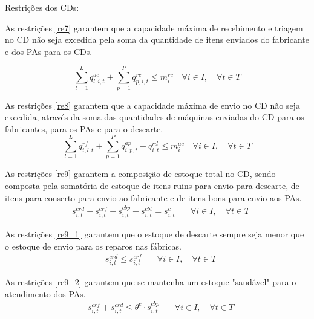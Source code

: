 
Restrições dos CDs:

As restrições \ref{re7} garantem que a capacidade máxima de recebimento e triagem no CD não seja excedida pela soma da quantidade de itens enviados do fabricante e dos PAs para os CDs.

\begin{equation}\label{re7}
\sum_{l=1}^{L} q^{ac}_{l,i,t} + \sum_{p=1}^{P} q^{rc}_{p,i,t} \leq m^{rc}_{i} \quad \forall i \in I, \quad \forall t \in T
\end{equation}

As restrições \ref{re8} garantem que a capacidade máxima de envio no CD não seja excedida, através da soma das quantidades de máquinas enviadas do CD para os fabricantes, para os PAs e para o descarte.
\begin{equation}\label{re8}
\sum_{l=1}^{L} q^{rf}_{i,l,t} + \sum_{p=1}^{P} q^{ap}_{i,p,t} + q^{rd}_{i,t}\leq m^{ac}_{i} \quad \forall i \in I, \quad \forall t \in T
\end{equation}

As restrições \ref{re9} garantem a composição de estoque total no CD, sendo composta pela somatória de estoque de itens ruins para envio para descarte, de itens para conserto para envio ao fabricante e de itens bons para envio aos PAs.
\begin{equation}\label{re9}
\begin{aligned}
& s^{crd}_{i,t} + s^{crf}_{i,t} + s^{cbp}_{i,t} + s^{cbt}_{i,t} = s^{c}_{i,t} \quad & \forall i \in I, \quad \forall t \in T
\end{aligned}
\end{equation}

As restrições \ref{re9_1} garantem que o estoque de descarte sempre seja menor que o estoque de envio para os reparos nas fábricas.
\begin{equation}\label{re9_1}
\begin{aligned}
& s^{crd}_{i,t} \le s^{crf}_{i,t} \quad & \forall i \in I, \quad \forall t \in T
\end{aligned}
\end{equation}

As restrições \ref{re9_2} garantem que se mantenha um estoque "saudável" para o atendimento dos PAs.
\begin{equation}\label{re9_2}
\begin{aligned}
& s^{crf}_{i,t} + s^{crd}_{i,t} \le \theta^{c} \cdot s^{cbp}_{i,t} \quad & \forall i \in I, \quad \forall t \in T
\end{aligned}
\end{equation}

